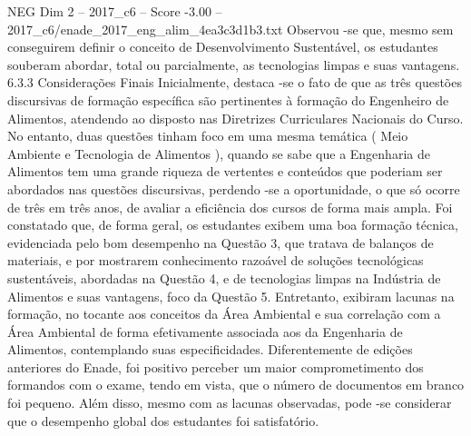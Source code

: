 \begin{textsample}{NEG Dim 2 – 2017\_c6 – Score -3.00 – 2017\_c6/enade\_2017\_eng\_alim\_4ea3c3d1b3.txt}
Observou -se que, mesmo sem conseguirem definir o conceito de Desenvolvimento Sustentável, os estudantes souberam abordar, total ou parcialmente, as tecnologias limpas e suas vantagens. 6.3.3 Considerações Finais Inicialmente, destaca -se o fato de que as três questões discursivas de formação específica são pertinentes à formação do Engenheiro de Alimentos, atendendo ao disposto nas Diretrizes Curriculares Nacionais do Curso.
No entanto, duas questões tinham foco em uma mesma temática ( Meio Ambiente e Tecnologia de Alimentos ), quando se sabe que a Engenharia de Alimentos tem uma grande riqueza de vertentes e conteúdos que poderiam ser abordados nas questões discursivas, perdendo -se a oportunidade, o que só ocorre de três em três anos, de avaliar a eficiência dos cursos de forma mais ampla.
Foi constatado que, de forma geral, os estudantes exibem uma boa formação técnica, evidenciada pelo bom desempenho na Questão 3, que tratava de balanços de materiais, e por mostrarem conhecimento razoável de soluções tecnológicas sustentáveis, abordadas na Questão 4, e de tecnologias limpas na Indústria de Alimentos e suas vantagens, foco da Questão 5.
Entretanto, exibiram lacunas na formação, no tocante aos conceitos da Área Ambiental e sua correlação com a Área Ambiental de forma efetivamente associada aos da Engenharia de Alimentos, contemplando suas especificidades.
Diferentemente de edições anteriores do Enade, foi positivo perceber um maior comprometimento dos formandos com o exame, tendo em vista, que o número de documentos em branco foi pequeno.
Além disso, mesmo com as lacunas observadas, pode -se considerar que o desempenho global dos estudantes foi satisfatório.

\end{textsample}
